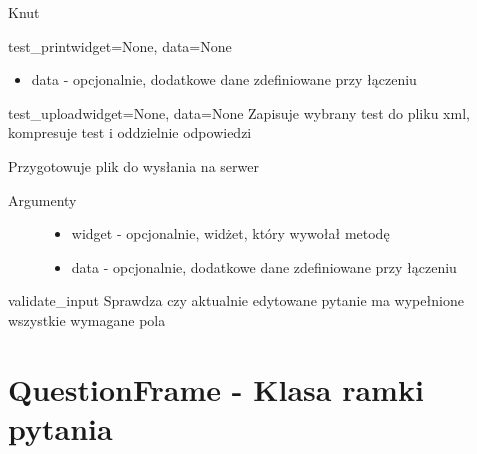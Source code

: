 \documentclass[letterpaper,10pt,polish]{manual}
\begin{document}
\begin{classdesc}{Knut}{}
\begin{methoddesc}{test\_print}{widget=None, data=None}
\begin{description}
\begin{itemize}
\item {} 
data  - opcjonalnie, dodatkowe dane zdefiniowane przy łączeniu

\end{itemize}

\end{description}
\end{methoddesc}

\hypertarget{Knut.Knut.test\_upload}{}\begin{methoddesc}{test\_upload}{widget=None, data=None}
Zapisuje wybrany test do pliku xml, kompresuje test i oddzielnie odpowiedzi

Przygotowuje plik do wysłania na serwer
\begin{description}
\item[Argumenty] \leavevmode\begin{itemize}
\item {} 
widget - opcjonalnie, widżet, który wywołał metodę

\item {} 
data - opcjonalnie, dodatkowe dane zdefiniowane przy łączeniu

\end{itemize}

\end{description}
\end{methoddesc}

\hypertarget{Knut.Knut.validate\_input}{}\begin{methoddesc}{validate\_input}{}
Sprawdza czy aktualnie edytowane pytanie ma wypełnione wszystkie wymagane pola
\end{methoddesc}
\end{classdesc}
\hypertarget{questionframe}{}

\chapter{QuestionFrame - Klasa ramki pytania}
\hypertarget{module-QuestionFrame}{}
\modulesynopsis{}
\end{document}
